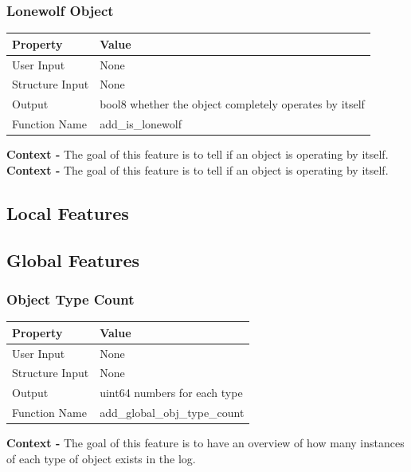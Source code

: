 \documentclass{article}
\begin{document}
\subsubsection{Lonewolf Object}
\begin{center}
	\begin{tabular}{| p{3cm} p{7cm} |}
		\hline
		\textbf{Property} & \textbf{Value}\\
		\hline
		User Input & None\\
		Structure Input & None\\
		Output & bool8 whether the object completely operates by itself\\
		Function Name & add\_is\_lonewolf\\
		\hline
	\end{tabular}
\end{center}

\textbf{Context -} The goal of this feature is to tell if an object is operating by itself.
\\


\textbf{Context -} The goal of this feature is to tell if an object is operating by itself.
\\

\subsection{Local Features}
\subsection{Global Features}
\subsubsection{Object Type Count}
\begin{center}
	\begin{tabular}{| p{3cm} p{7cm} |}
		\hline
		\textbf{Property} & \textbf{Value}\\
		\hline
		User Input & None\\
		Structure Input & None\\
		Output & uint64 numbers for each type\\
		Function Name & add\_global\_obj\_type\_count\\
		\hline
	\end{tabular}
\end{center}

\textbf{Context -} The goal of this feature is to have an overview of how many instances of each type of object exists in the log.\\
\end{document}
